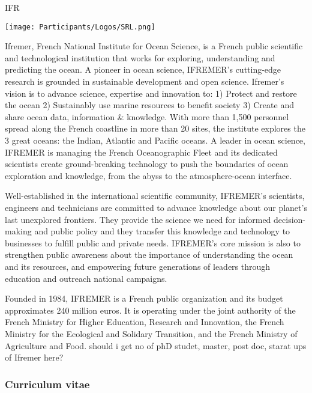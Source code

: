 \begin{sitedescription}{IFR}

\begin{center}
\texttt{[image: Participants/Logos/SRL.png]}
\end{center}


Ifremer, French National Institute for Ocean Science, is a
French public scientific and technological institution that works for
exploring, understanding and predicting the ocean.
A pioneer in ocean science, IFREMER’s cutting-edge research is
grounded in sustainable development and open science.
Ifremer's vision is to advance science, expertise and innovation to:
1) Protect and restore the ocean
2) Sustainably use marine resources to benefit society
3) Create and share ocean data, information & knowledge.
With more than 1,500 personnel spread along the French coastline
in more than 20 sites, the institute explores the 3 great oceans:
the Indian, Atlantic and Pacific oceans. A leader in ocean science,
IFREMER is managing the French Oceanographic Fleet and its dedicated
scientists create ground-breaking technology to push the boundaries
of ocean exploration and knowledge, from the abyss to the atmosphere-ocean interface.

Well-established in the international scientific community, IFREMER's scientists,
engineers and technicians are committed to advance knowledge about our planet’s
last unexplored frontiers. They provide the science we need for informed
decision-making and public policy and they transfer this knowledge and technology
to businesses to fulfill public and private needs. IFREMER's core mission is also to
strengthen public awareness about the importance of understanding the ocean and
its resources, and empowering future generations of leaders through education
and outreach national campaigns.

Founded in 1984, IFREMER is a French public organization and its budget
approximates 240 million euros. It is operating under the joint authority of
the French Ministry for Higher Education, Research and Innovation,
the French Ministry for the Ecological and Solidary Transition, and the
French Ministry of Agriculture and Food.
 should i get no of phD studet, master, post doc, starat ups of Ifremer here?


\subsubsection*{Curriculum vitae}


\end{sitedescription}
